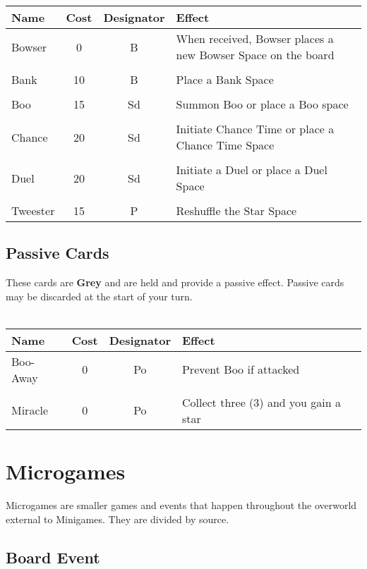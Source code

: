 \documentclass{article}
\begin{document}
\begin{tabular}{lccp{5cm}}
\textbf{Name} & \textbf{Cost} & \textbf{Designator} & \textbf{Effect} \\
\hline
Bowser & 0 & B & When received, Bowser places a new Bowser Space on the board \\
&&& \\
Bank & 10 & B & Place a Bank Space \\
&&& \\
Boo & 15 & Sd & Summon Boo or place a Boo space \\
&&& \\
Chance & 20 & Sd & Initiate Chance Time or place a Chance Time Space \\
&&& \\
Duel & 20 & Sd & Initiate a Duel or place a Duel Space \\
&&& \\
Tweester & 15 & P & Reshuffle the Star Space \\
\end{tabular}

\subsection{Passive Cards}

These cards are \textbf{Grey} and are held and provide a passive effect.
Passive cards may be discarded at the start of your turn.
\\\\

\begin{tabular}{lccp{5cm}}
\textbf{Name} & \textbf{Cost} & \textbf{Designator} & \textbf{Effect} \\
\hline
Boo-Away & 0 & Po & Prevent Boo if attacked \\
&&& \\
Miracle & 0 & Po & Collect three (3) and you gain a star \\
\end{tabular}

\section{Microgames}

Microgames are smaller games and events that happen throughout the overworld external
to Minigames.  They are divided by source.

\subsection{Board Event}
\end{document}
